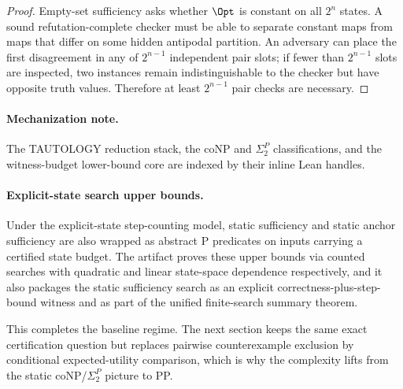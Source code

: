 
\begin{proof}
Empty-set sufficiency asks whether $\Opt$ is constant on all $2^n$ states. A sound refutation-complete checker must be able to separate constant maps from maps that differ on some hidden antipodal partition. An adversary can place the first disagreement in any of $2^{n-1}$ independent pair slots; if fewer than $2^{n-1}$ slots are inspected, two instances remain indistinguishable to the checker but have opposite truth values. Therefore at least $2^{n-1}$ pair checks are necessary.
\end{proof}

\paragraph{Mechanization note.}
The TAUTOLOGY reduction stack, the coNP and $\Sigma_2^P$ classifications, and the witness-budget lower-bound core are indexed by their inline Lean handles.

\paragraph{Explicit-state search upper bounds.}
Under the explicit-state step-counting model, static sufficiency
and static anchor sufficiency are also wrapped as abstract \textsc{P}
predicates on inputs carrying a certified state budget. The artifact proves
these upper bounds via counted searches with quadratic and linear state-space
dependence respectively, and it also packages the static sufficiency search as
an explicit correctness-plus-step-bound witness and as part of the unified
finite-search summary theorem. 

This completes the baseline regime. The next section keeps the same exact
certification question but replaces pairwise counterexample exclusion by
conditional expected-utility comparison, which is why the complexity lifts from
the static coNP/$\Sigma_2^P$ picture to PP.
